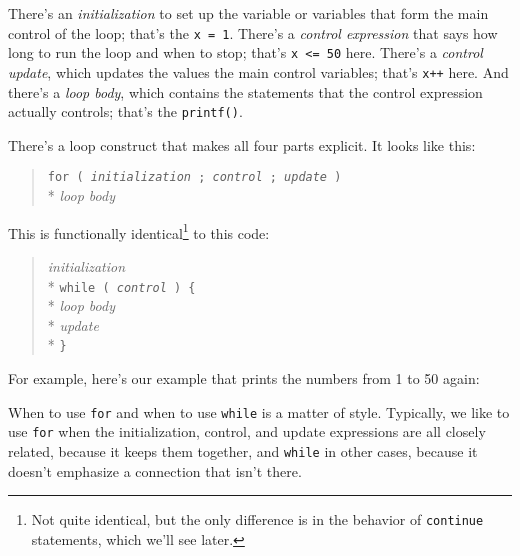     There's an {\em initialization}\/ to set up the variable or
variables that form the main control of the loop; that's the {\tt x =
1}.  There's a {\em control expression}\/ that says how long to run the
loop and when to stop; that's {\tt x <= 50} here.  There's a {\em
control update}\/, which updates the values the main control variables;
that's {\tt x++} here.  And there's a {\em loop body}\/, which contains
the statements that the control expression actually controls; that's the
{\tt printf()}.

    There's a loop construct that makes all four parts explicit.  It
looks like this:

\begin{quote}
{\tt for ( {\em initialization}\/ ; {\em control}\/ ; {\em update}\/ ) } \\*
{\em \mbox{\hspace{.25in}} loop body}\/
\end{quote}

This is functionally identical\footnote{Not quite identical, but the
only difference is in the behavior of {\tt continue} statements, which
we'll see later.} to this code:

\begin{quote}
{\em initialization}\/ \\*
{\tt while ( {\em control} ) \{ } \\*
{\em \mbox{\hspace{.25in}} loop body}\/ \\*
{\em \mbox{\hspace{.25in}} update}\/ \\*
{\tt \} }
\end{quote}

For example, here's our example that prints the numbers from 1 to 50
again:


When to use {\tt for} and when to use {\tt while} is a matter of style.
Typically, we like to use {\tt for} when the initialization, control,
and update expressions are all closely related, because it keeps them
together, and {\tt while} in other cases, because it doesn't emphasize a
connection that isn't there.

